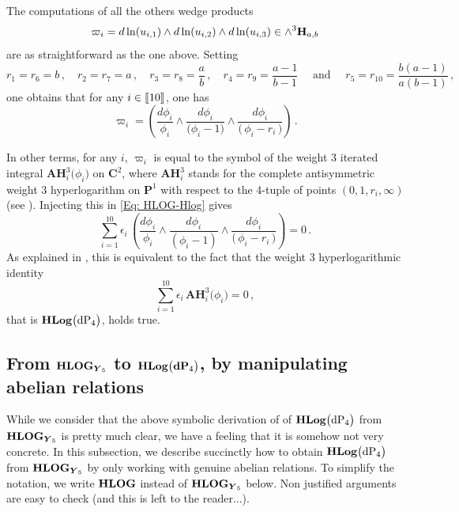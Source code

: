 \documentclass[11pt]{amsart}
\newcommand{\mk}{\medskip}
\begin{document}
The computations of all the others wedge products 
$$\varpi_i= {d \ln(u_{i,1}})
\wedge 
{d \ln(u_{i,2}})
\wedge 
{d \ln(u_{i,3}})\in \wedge^3 {\bf H}_{a,b}$$ are as straightforward as the one above.
 Setting 
 $$
r_1=r_6=b
\, ,  \quad 
r_2=r_7=a
\, ,  \quad 
r_3=r_8=\frac{a}{b}
\, ,  \quad 
r_4=r_9=\frac{a-1}{b-1}
 \quad \mbox{ and } \quad 
r_5=r_{10}=\frac{b(a-1)}{a(b-1)}\, , 
$$
one obtains that for any $i\in [\hspace{-0.05cm}[ 10  ]\hspace{-0.05cm}]$, one has 
$$
\varpi_i
= 
  \left(\frac{d\phi_i}{\phi_i} \wedge 
\frac{d\phi_i}{\Big(\phi_i-1\Big)}
\wedge  \frac{d\phi_i}{\Big( \,\phi_i-
{r_i}\, 
\Big)}\right)\, . 
%
%
$$

In other terms, for any $i$, $\varpi_i$ is equal  to the symbol
of the weight 3 iterated integral $\boldsymbol{AH}^3_i\big( \phi_i\big)$ on $\mathbf C^2$, where 
$\boldsymbol{AH}^3_i$ stands for the complete antisymmetric weight 3 hyperlogarithm on $\mathbf P^1$ with respect to the 4-tuple of points $(0,1,r_i,\infty)$ (see \cite[\S2.1]{CP}).
Injecting this in \eqref{Eq: HLOG-Hlog} gives 
$$
\sum_{i=1}^{10}\epsilon_i\,   \left(\frac{d\phi_i}{\phi_i} \wedge 
\frac{d\phi_i}{(\phi_i-1)}
\wedge  \frac{d\phi_i}{\big( \,\phi_i-
{r_i}\, 
\big)}\right)=0\, .
$$
As explained in \cite{CP}, this is equivalent to the fact that the weight 3 hyperlogarithmic identity 
$$
\sum_{i=1}^{10}\epsilon_i\,   \boldsymbol{AH}^3_i\big( \phi_i\big) =0\, , 
$$
that is ${\bf HLog}\big({\rm dP}_4\big)$,  holds true. 




\subsection{\bf From ${\bf HLOG}_{ \boldsymbol{Y}_5 }$ to 
${\bf HLog}\big({\bf dP}_4\big)$, by manipulating abelian relations}
\label{SS:manipulating-ARs}
While we consider that the above symbolic derivation of 
of ${\bf HLog}\big({\rm dP}_4\big)$ from 
${\bf HLOG}_{ \boldsymbol{Y}_5 }$ is pretty much clear, we have a feeling that it is somehow  not very concrete. 
  In this subsection, we describe succinctly how to 
obtain ${\bf HLog}\big({\rm dP}_4\big)$ from ${\bf HLOG}_{ \boldsymbol{Y}_5 }$ by only working with genuine abelian relations.  To simplify the notation, we write 
${\bf HLOG}$ instead of ${\bf HLOG}_{ \boldsymbol{Y}_5 }$ below. Non justified arguments are easy to check (and this is left to the reader...). 
\mk 
\end{document}
